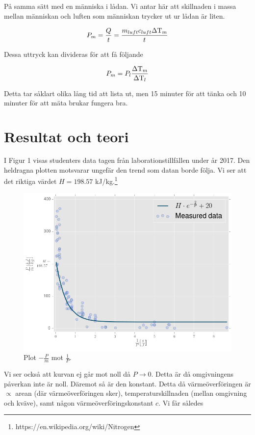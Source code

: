 \documentclass[11pt]{article}
\begin{document}
På samma sätt med en människa i lådan. Vi antar här att skillnaden i massa mellan människan och luften som människan trycker ut ur lådan är liten.

\begin{equation*}
    P_m = \frac{Q}{t} = \frac{m_{luft} c_{luft} \Delta \text T_m}{t}
\end{equation*}

Dessa uttryck kan divideras för att få följande

\begin{equation*}
    P_m = P_l \frac{\Delta \text T_m}{\Delta \text T_l}
\end{equation*}

Detta tar såklart olika lång tid att lista ut, men 15 minuter för att tänka och 10 minuter för att mäta brukar fungera bra.

\section{Resultat och teori}

I Figur 1 visas studenters data tagen från laborationstillfällen under år 2017. Den heldragna plotten motsvarar ungefär den trend som datan borde följa. Vi ser att det riktiga värdet $H = 198.57$ kJ/kg.\footnote{https://en.wikipedia.org/wiki/Nitrogen}

\begin{figure}[h]
\center
    \includegraphics[width = .75\linewidth]{nitrogenEnthalpy.png}
    \caption{Plot $- \frac{P}{\dot m}$ mot $\frac{1}{P}$.}
\label{Fig: HCurve}
\end{figure}

Vi ser också att kurvan ej går mot noll då $P \to 0$. Detta är då omgivningens påverkan inte är noll. Däremot så är den konstant. Detta då värmeöverföringen är $\propto$ arean (där värmeöverföringen sker), temperaturskillnaden (mellan omgivning och kväve), samt någon värmeöverföringskonstant $c$. Vi får således
\end{document}
